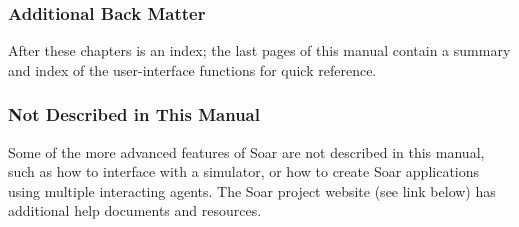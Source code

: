 








\subsubsection*{Additional Back Matter}

After these chapters is an index; the last pages of this manual contain a summary and index of the user-interface functions for quick reference.


\subsubsection*{Not Described in This Manual}

Some of the more advanced features of Soar are not described in this
manual, such as how to interface with a simulator, or how to create Soar
applications using multiple interacting agents. The Soar project website (see link below)
has additional help documents and resources.

